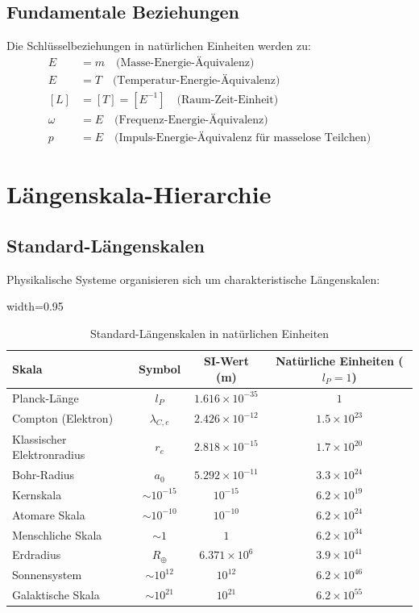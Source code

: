 	\subsection{Fundamentale Beziehungen}
	
	Die Schlüsselbeziehungen in natürlichen Einheiten werden zu:
	\begin{align}
		E &= m \quad \text{(Masse-Energie-Äquivalenz)} \\
		E &= T \quad \text{(Temperatur-Energie-Äquivalenz)} \\
		[L] &= [T] = [E^{-1}] \quad \text{(Raum-Zeit-Einheit)} \\
		\omega &= E \quad \text{(Frequenz-Energie-Äquivalenz)} \\
		p &= E \quad \text{(Impuls-Energie-Äquivalenz für masselose Teilchen)}
	\end{align}
	
	\section{Längenskala-Hierarchie}
	
	\subsection{Standard-Längenskalen}
	
	Physikalische Systeme organisieren sich um charakteristische Längenskalen:
	
	\begin{table}[htbp]
		\centering
		\begin{adjustbox}{width=0.95\textwidth}
			\begin{tabular}{lccc}
				\toprule
				\textbf{Skala} & \textbf{Symbol} & \textbf{SI-Wert (m)} & \textbf{Natürliche Einheiten ($l_P = 1$)} \\
				\midrule
				Planck-Länge & $l_P$ & $1.616 \times 10^{-35}$ & $1$ \\
				Compton (Elektron) & $\lambda_{C,e}$ & $2.426 \times 10^{-12}$ & $1.5 \times 10^{23}$ \\
				Klassischer Elektronradius & $r_e$ & $2.818 \times 10^{-15}$ & $1.7 \times 10^{20}$ \\
				Bohr-Radius & $a_0$ & $5.292 \times 10^{-11}$ & $3.3 \times 10^{24}$ \\
				Kernskala & $\sim 10^{-15}$ & $10^{-15}$ & $6.2 \times 10^{19}$ \\
				Atomare Skala & $\sim 10^{-10}$ & $10^{-10}$ & $6.2 \times 10^{24}$ \\
				Menschliche Skala & $\sim 1$ & $1$ & $6.2 \times 10^{34}$ \\
				Erdradius & $R_\oplus$ & $6.371 \times 10^6$ & $3.9 \times 10^{41}$ \\
				Sonnensystem & $\sim 10^{12}$ & $10^{12}$ & $6.2 \times 10^{46}$ \\
				Galaktische Skala & $\sim 10^{21}$ & $10^{21}$ & $6.2 \times 10^{55}$ \\
				\bottomrule
			\end{tabular}
		\end{adjustbox}
		\caption{Standard-Längenskalen in natürlichen Einheiten}
		\label{tab:laengenskalen}
	\end{table}
	
